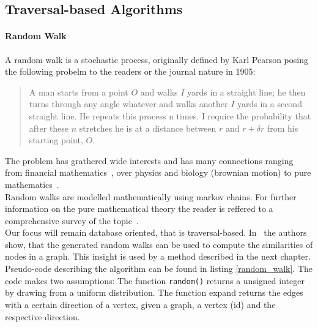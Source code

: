     \subsection{Traversal-based Algorithms}\label{\positionnumber}
        \paragraph{Random Walk}
            A random walk is a stochastic process, originally defined by Karl Pearson posing the following probelm to the readers or the journal nature in 1905: 
            \begin{quote}
                A man starts from a point $O$ and walks $I$ yards in a straight line; he then turns through any angle whatever and walks another $I$ yards in a second straight line. He repeats this process n times. I require the probability that after these $n$ stretches he is at a distance between $r$ and $r + \delta r$ from his starting point, $O$.
            \end{quote}
            The problem has grathered wide interests and has many connections ranging from financial mathematics~\autocite{bachelier1900theorie}, over physics and biology (brownian motion\autocite{brown1828xxvii}) to pure mathematics~\autocite{wiener1976collected}. \\
            
            Random walks are modelled mathematically using markov chains.            
            For further information on the pure mathematical theory the reader is reffered to a comprehensive survey of the topic~\autocite{lovasz1993random}. \\
            
            Our focus will remain database oriented, that is traversal-based.
            In~\autocite{fouss2007random} the authors show, that the generated random walks can be used to compute the similarities of nodes in a graph. 
            This insight is used by a method described in the next chapter. \\
            
            Pseudo-code describing the algorithm can be found in listing \ref{random_walk}. The code makes two assumptions: The function \texttt{random()} returns a unsigned integer by drawing from a uniform distribution. The function expand returns the edges with a certain direction of a vertex, given a graph, a vertex (id) and the respective direction. \\
            

